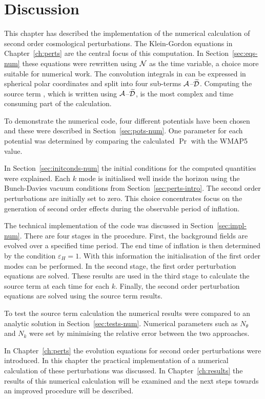 \section{Discussion}
\label{sec:disc-numerical}
This chapter has described the implementation of the numerical calculation of second
order cosmological perturbations.
The Klein-Gordon equations in Chapter~\ref{ch:perts} are the central focus of this
computation. In Section~\ref{sec:eqs-num} these equations were rewritten using $\mathcal{N}$
as the time variable, a choice more suitable for numerical work. The convolution
integrals in  can be expressed in spherical polar
coordinates and split into four sub-terms $\mathcal{A}$--$\widetilde{\mathcal{D}}$. Computing the source term
, which is written using $\mathcal{A}$--$\widetilde{\mathcal{D}}$, is the most complex
and
time consuming part of the calculation.

To demonstrate the numerical code, four different potentials have been chosen and
these were described in Section~\ref{sec:pots-num}. One parameter for each
potential was determined by comparing the calculated $\Pr$ with the WMAP5 value.

In Section~\ref{sec:initconds-num} the initial conditions for the computed
quantities were explained. Each $k$ mode is initialised well inside the horizon
using the Bunch-Davies vacuum conditions from Section~\ref{sec:perts-intro}. The
second order perturbations are initially set to zero. This choice
concentrates focus
on the generation of second order effects during the observable period of
inflation.


The technical implementation of the code was discussed in
Section~\ref{sec:impl-num}. There are four stages in the procedure. First, the
background fields are evolved over a specified time period. The end time of
inflation is then determined by the condition $\varepsilon_H=1$. With this
information the initialisation of the first order modes can be performed. In the
second stage, the first order perturbation equations are solved. These results are
used in the third stage to calculate the source term  at each
time for each $k$. Finally, the second order perturbation equations are solved using
the source term results.

To test the source term calculation the numerical results were compared to an
analytic solution in Section~\ref{sec:tests-num}. Numerical parameters such as
$N_\theta$ and $N_k$ were set by minimising the relative error between the two
approaches.

In Chapter~\ref{ch:perts} the evolution equations for second order perturbations
were introduced. In this chapter the practical implementation of a numerical
calculation of these perturbations was discussed. In Chapter~\ref{ch:results} the
results of this numerical calculation will be examined and the next steps towards an
improved procedure will be described.